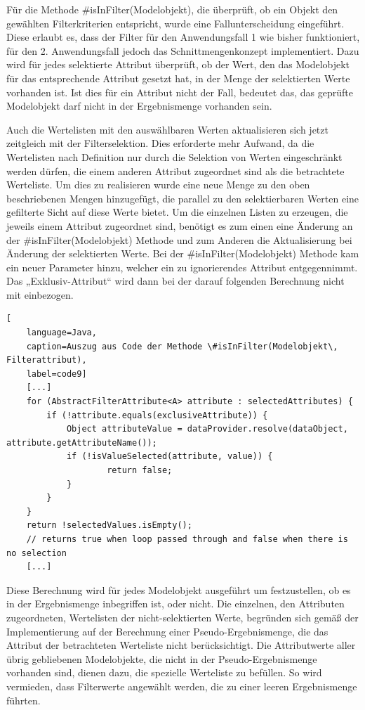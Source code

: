 Für die Methode \#isInFilter(Modelobjekt), die überprüft, ob ein Objekt den gewählten Filterkriterien entspricht, wurde eine Fallunterscheidung eingeführt. Diese erlaubt es, dass der Filter für den Anwendungsfall 1 wie bisher funktioniert, für den 2. Anwendungsfall jedoch das Schnittmengenkonzept implementiert. Dazu wird für jedes selektierte Attribut überprüft, ob der Wert, den das Modelobjekt für das entsprechende Attribut gesetzt hat, in der Menge der selektierten Werte vorhanden ist. Ist dies für ein Attribut nicht der Fall, bedeutet das, das geprüfte Modelobjekt darf nicht in der Ergebnismenge vorhanden sein.

Auch die Wertelisten mit den auswählbaren Werten aktualisieren sich jetzt zeitgleich mit der Filterselektion. Dies erforderte mehr Aufwand, da die Wertelisten nach Definition nur durch die Selektion von Werten eingeschränkt werden dürfen, die einem anderen Attribut zugeordnet sind als die betrachtete Werteliste. Um dies zu realisieren wurde eine neue Menge zu den oben beschriebenen Mengen hinzugefügt, die parallel zu den selektierbaren Werten eine gefilterte Sicht auf diese Werte bietet. Um die einzelnen Listen zu erzeugen, die jeweils einem Attribut zugeordnet sind, benötigt es zum einen eine Änderung an der \#isInFilter(Modelobjekt) Methode und zum Anderen die Aktualisierung bei Änderung der selektierten Werte. Bei der \#isInFilter(Modelobjekt) Methode kam ein neuer Parameter hinzu, welcher ein zu ignorierendes Attribut entgegennimmt. Das „Exklusiv-Attribut“ wird dann bei der darauf folgenden Berechnung nicht mit einbezogen.

\begin{lstlisting}[
    language=Java,
    caption=Auszug aus Code der Methode \#isInFilter(Modelobjekt\, Filterattribut),
    label=code9]
	[...]
	for (AbstractFilterAttribute<A> attribute : selectedAttributes) {
		if (!attribute.equals(exclusiveAttribute)) {
			Object attributeValue = dataProvider.resolve(dataObject, attribute.getAttributeName());
			if (!isValueSelected(attribute, value)) {
					return false;
			}
    	}
	}
	return !selectedValues.isEmpty();
	// returns true when loop passed through and false when there is no selection
	[...]
\end{lstlisting}

Diese Berechnung wird für jedes Modelobjekt ausgeführt um festzustellen, ob es in der Ergebnismenge inbegriffen ist, oder nicht. Die einzelnen, den Attributen zugeordneten, Wertelisten der nicht-selektierten Werte, begründen sich gemäß der Implementierung auf der Berechnung einer Pseudo-Ergebnismenge, die das Attribut der betrachteten Werteliste nicht berücksichtigt. Die Attributwerte aller übrig gebliebenen Modelobjekte, die nicht in der Pseudo-Ergebnismenge vorhanden sind, dienen dazu, die spezielle Werteliste zu befüllen. So wird vermieden, dass Filterwerte angewählt werden, die zu einer leeren Ergebnismenge führten.

